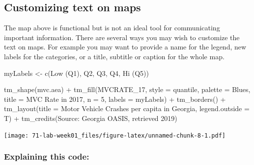 \documentclass[
]{book}
\newenvironment{Shaded}{\begin{snugshade}}{\end{snugshade}}
\newcommand{\AttributeTok}[1]{\textcolor[rgb]{0.77,0.63,0.00}{#1}}
\newcommand{\DecValTok}[1]{\textcolor[rgb]{0.00,0.00,0.81}{#1}}
\newcommand{\FunctionTok}[1]{\textcolor[rgb]{0.00,0.00,0.00}{#1}}
\newcommand{\NormalTok}[1]{#1}
\newcommand{\OtherTok}[1]{\textcolor[rgb]{0.56,0.35,0.01}{#1}}
\newcommand{\SpecialCharTok}[1]{\textcolor[rgb]{0.00,0.00,0.00}{#1}}
\newcommand{\StringTok}[1]{\textcolor[rgb]{0.31,0.60,0.02}{#1}}
\begin{document}
\hypertarget{customizing-text-on-maps-1}{%
\subsection{Customizing text on maps}\label{customizing-text-on-maps-1}}

The map above is functional but is not an ideal tool for communicating important information. There are several ways you may wish to customize the text on maps. For example you may want to provide a name for the legend, new labels for the categories, or a title, subtitle or caption for the whole map.

\begin{Shaded}
\begin{Highlighting}[]
\NormalTok{myLabels }\OtherTok{\textless{}{-}} \FunctionTok{c}\NormalTok{(}\StringTok{\textquotesingle{}Low (Q1)\textquotesingle{}}\NormalTok{, }\StringTok{\textquotesingle{}Q2\textquotesingle{}}\NormalTok{, }\StringTok{\textquotesingle{}Q3\textquotesingle{}}\NormalTok{, }\StringTok{\textquotesingle{}Q4\textquotesingle{}}\NormalTok{, }\StringTok{\textquotesingle{}Hi (Q5)\textquotesingle{}}\NormalTok{)}

\FunctionTok{tm\_shape}\NormalTok{(mvc.aea) }\SpecialCharTok{+}
  \FunctionTok{tm\_fill}\NormalTok{(}\StringTok{\textquotesingle{}MVCRATE\_17\textquotesingle{}}\NormalTok{,}
          \AttributeTok{style =} \StringTok{\textquotesingle{}quantile\textquotesingle{}}\NormalTok{,}
          \AttributeTok{palette =} \StringTok{\textquotesingle{}Blues\textquotesingle{}}\NormalTok{,}
          \AttributeTok{title =} \StringTok{\textquotesingle{}MVC Rate in 2017\textquotesingle{}}\NormalTok{,}
          \AttributeTok{n =} \DecValTok{5}\NormalTok{, }
          \AttributeTok{labels =}\NormalTok{ myLabels) }\SpecialCharTok{+}
  \FunctionTok{tm\_borders}\NormalTok{() }\SpecialCharTok{+}
\FunctionTok{tm\_layout}\NormalTok{(}\AttributeTok{title =} \StringTok{\textquotesingle{}Motor Vehicle Crashes per capita in Georgia\textquotesingle{}}\NormalTok{,}
          \AttributeTok{legend.outside =}\NormalTok{ T) }\SpecialCharTok{+}
\FunctionTok{tm\_credits}\NormalTok{(}\StringTok{\textquotesingle{}Source: Georgia OASIS, retrieved 2019\textquotesingle{}}\NormalTok{)}
\end{Highlighting}
\end{Shaded}

\texttt{[image: 71-lab-week01\_files/figure-latex/unnamed-chunk-8-1.pdf]}

\hypertarget{explaining-this-code-1}{%
\subsubsection{Explaining this code:}\label{explaining-this-code-1}}
\end{document}

